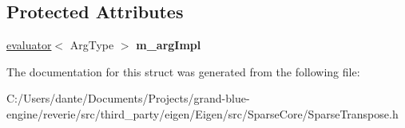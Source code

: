 \subsection*{Protected Attributes}
\begin{DoxyCompactItemize}
\item 
\mbox{\label{struct_eigen_1_1internal_1_1unary__evaluator_3_01_transpose_3_01_arg_type_01_4_00_01_iterator_based_01_4_a024045b61333b8a671b3fa3a29b71c28}} 
\mbox{\hyperlink{struct_eigen_1_1internal_1_1evaluator}{evaluator}}$<$ Arg\+Type $>$ {\bfseries m\+\_\+arg\+Impl}
\end{DoxyCompactItemize}


The documentation for this struct was generated from the following file\+:\begin{DoxyCompactItemize}
\item 
C\+:/\+Users/dante/\+Documents/\+Projects/grand-\/blue-\/engine/reverie/src/third\+\_\+party/eigen/\+Eigen/src/\+Sparse\+Core/Sparse\+Transpose.\+h\end{DoxyCompactItemize}
